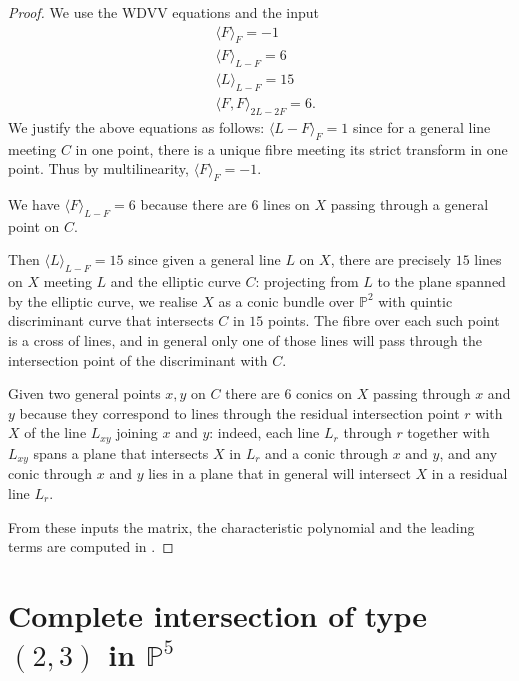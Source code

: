 \documentclass[11pt]{amsart}
\theoremstyle{plain}
\numberwithin{equation}{section}
\theoremstyle{definition}
\theoremstyle{remark}
\renewcommand{\P}{\mathbb P}
\newcommand{\bP}{\mathbb{P}}
\begin{document}
\begin{proof}
We use the WDVV equations and the input
\begin{align*}
&\langle F \rangle_F = -1 \\
&\langle F \rangle_{L-F} = 6 \\
&\langle L \rangle_{L-F} = 15\\
&\langle F,F \rangle_{2L-2F} = 6.
\end{align*}
We justify the above equations as follows: $\langle L-F \rangle_F =1$ since for a general line meeting $C$ in one point, there is a unique fibre meeting its strict transform in one point. Thus by multilinearity, $\langle F \rangle_F = -1$.

\noindent
We have $\langle F \rangle_{L-F} = 6 $ because there are $6$ lines on $X$ passing through a general point on $C$.

\noindent
Then $\langle L \rangle_{L-F} = 15$ since given a general line $L$ on $X$, there are precisely $15$ lines on $X$ meeting $L$ and the elliptic curve $C$: projecting from $L$ to the plane spanned by the elliptic curve, we realise $X$ as a conic bundle over $\P^2$ with quintic discriminant curve that intersects $C$ in $15$ points. The fibre over each such point is a cross of lines, and in general only one of those lines will pass through the intersection point of the discriminant with $C$. 

\noindent
Given two general points $x,y$ on $C$ there are $6$ conics on $X$ passing through $x$ and $y$ because they correspond to lines through the residual intersection point $r$ with $X$ of the line $L_{xy}$ joining $x$ and $y$: indeed, each line $L_r$ through $r$ together with $L_{xy}$ spans a plane that intersects $X$ in $L_r$ and a conic through $x$ and $y$, and any conic through $x$ and $y$ lies in a plane that in general will intersect $X$ in a residual line $L_r$.

From these inputs the matrix, the characteristic polynomial and the leading terms are computed in \cite{BvBS26}.
\end{proof}

\section{Complete intersection of type $(2,3)$ in $\bP^5$}\label{sCI23}
\end{document}
